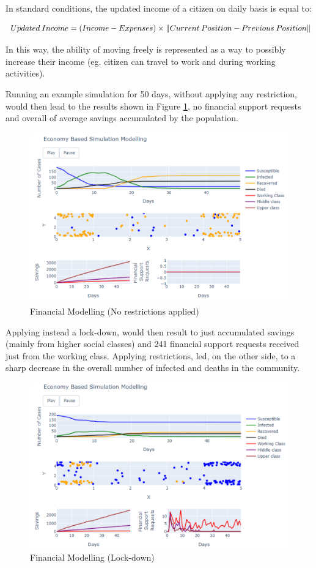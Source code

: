 In standard conditions, the updated income of a citizen on daily basis is equal to:

\useshortskip
\begin{align}
\ Updated\:Income = (Income-Expenses)\times \norm{Current\:Position-Previous\:Position}
\end{align}
\useshortskip

In this way, the ability of moving freely is represented as a way to possibly increase their income (eg. citizen can travel to work and during working activities).

Running an example simulation for 50 days, without applying any restriction, would then lead to the results shown in Figure \ref{fin1}, no financial support requests and overall  of average savings accumulated by the population.

\begin{figure}[ht!]%
    \centering
    \includegraphics[width=0.85\linewidth]{latex/images/fin1.pdf}
    \caption{Financial Modelling (No restrictions applied)}
    \label{fin1}
\end{figure}

Applying instead a lock-down, would then result to just 
accumulated savings (mainly from higher social classes) and 241 financial support requests received just from the working class. Applying restrictions, led, on the other side, to a sharp decrease in the overall number of infected and deaths in the community.

\begin{figure}[ht!]%
    \centering
    \includegraphics[width=0.85\linewidth]{latex/images/fin2.pdf}
    \caption{Financial Modelling (Lock-down)}
    \label{fin2}
\end{figure}

